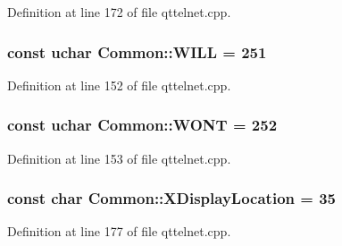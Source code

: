 Definition at line 172 of file qttelnet.cpp.

\hypertarget{namespaceCommon_afdc22f290799b81e461303620c36a738}{
\subsubsection[{WILL}]{\setlength{\rightskip}{0pt plus 5cm}const uchar {\bf Common::WILL} = 251}}
\label{namespaceCommon_afdc22f290799b81e461303620c36a738}


Definition at line 152 of file qttelnet.cpp.

\hypertarget{namespaceCommon_a32e6c59e2d488ff321bde5b69b2684f1}{
\subsubsection[{WONT}]{\setlength{\rightskip}{0pt plus 5cm}const uchar {\bf Common::WONT} = 252}}
\label{namespaceCommon_a32e6c59e2d488ff321bde5b69b2684f1}


Definition at line 153 of file qttelnet.cpp.

\hypertarget{namespaceCommon_aa07d7bc9e8e694b161a3bf254ec4a447}{
\subsubsection[{XDisplayLocation}]{\setlength{\rightskip}{0pt plus 5cm}const char {\bf Common::XDisplayLocation} = 35}}
\label{namespaceCommon_aa07d7bc9e8e694b161a3bf254ec4a447}


Definition at line 177 of file qttelnet.cpp.

